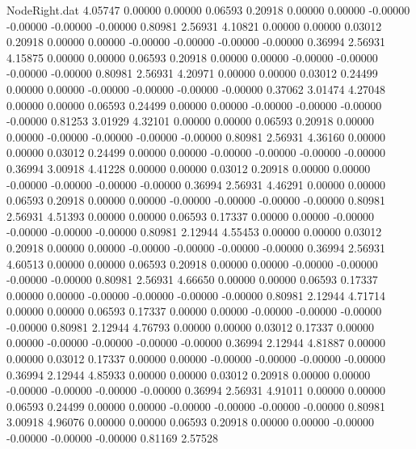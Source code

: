 \begin{filecontents}{NodeRight.dat}
   4.05747    0.00000    0.00000     0.06593    0.20918    0.00000    0.00000   -0.00000   -0.00000   -0.00000   -0.00000    0.80981    2.56931
   4.10821    0.00000    0.00000     0.03012    0.20918    0.00000    0.00000   -0.00000   -0.00000   -0.00000   -0.00000    0.36994    2.56931
   4.15875    0.00000    0.00000     0.06593    0.20918    0.00000    0.00000   -0.00000   -0.00000   -0.00000   -0.00000    0.80981    2.56931
   4.20971    0.00000    0.00000     0.03012    0.24499    0.00000    0.00000   -0.00000   -0.00000   -0.00000   -0.00000    0.37062    3.01474
   4.27048    0.00000    0.00000     0.06593    0.24499    0.00000    0.00000   -0.00000   -0.00000   -0.00000   -0.00000    0.81253    3.01929
   4.32101    0.00000    0.00000     0.06593    0.20918    0.00000    0.00000   -0.00000   -0.00000   -0.00000   -0.00000    0.80981    2.56931
   4.36160    0.00000    0.00000     0.03012    0.24499    0.00000    0.00000   -0.00000   -0.00000   -0.00000   -0.00000    0.36994    3.00918
   4.41228    0.00000    0.00000     0.03012    0.20918    0.00000    0.00000   -0.00000   -0.00000   -0.00000   -0.00000    0.36994    2.56931
   4.46291    0.00000    0.00000     0.06593    0.20918    0.00000    0.00000   -0.00000   -0.00000   -0.00000   -0.00000    0.80981    2.56931
   4.51393    0.00000    0.00000     0.06593    0.17337    0.00000    0.00000   -0.00000   -0.00000   -0.00000   -0.00000    0.80981    2.12944
   4.55453    0.00000    0.00000     0.03012    0.20918    0.00000    0.00000   -0.00000   -0.00000   -0.00000   -0.00000    0.36994    2.56931
   4.60513    0.00000    0.00000     0.06593    0.20918    0.00000    0.00000   -0.00000   -0.00000   -0.00000   -0.00000    0.80981    2.56931
   4.66650    0.00000    0.00000     0.06593    0.17337    0.00000    0.00000   -0.00000   -0.00000   -0.00000   -0.00000    0.80981    2.12944
   4.71714    0.00000    0.00000     0.06593    0.17337    0.00000    0.00000   -0.00000   -0.00000   -0.00000   -0.00000    0.80981    2.12944
   4.76793    0.00000    0.00000     0.03012    0.17337    0.00000    0.00000   -0.00000   -0.00000   -0.00000   -0.00000    0.36994    2.12944
   4.81887    0.00000    0.00000     0.03012    0.17337    0.00000    0.00000   -0.00000   -0.00000   -0.00000   -0.00000    0.36994    2.12944
   4.85933    0.00000    0.00000     0.03012    0.20918    0.00000    0.00000   -0.00000   -0.00000   -0.00000   -0.00000    0.36994    2.56931
   4.91011    0.00000    0.00000     0.06593    0.24499    0.00000    0.00000   -0.00000   -0.00000   -0.00000   -0.00000    0.80981    3.00918
   4.96076    0.00000    0.00000     0.06593    0.20918    0.00000    0.00000   -0.00000   -0.00000   -0.00000   -0.00000    0.81169    2.57528

\end{filecontents}
